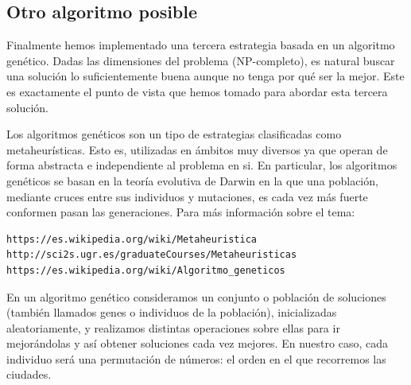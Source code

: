 \documentclass{article}
\begin{document}
\subsection{Otro algoritmo posible}

Finalmente hemos implementado una tercera estrategia basada en un algoritmo genético. Dadas las dimensiones del problema (NP-completo), es natural buscar una solución lo suficientemente buena aunque no tenga por qué ser la mejor. Este es exactamente el punto de vista que hemos tomado para abordar esta tercera solución.

Los algoritmos genéticos son un tipo de estrategias clasificadas como metaheurísticas. Esto es, utilizadas en ámbitos muy diversos ya que operan de forma abstracta e independiente al problema en si. En particular, los algoritmos genéticos se basan en la teoría evolutiva de Darwin en la que una población, mediante cruces entre sus individuos y mutaciones, es cada vez más fuerte conformen pasan las generaciones. Para más información sobre el tema:

\begin{verbatim}
https://es.wikipedia.org/wiki/Metaheuristica
http://sci2s.ugr.es/graduateCourses/Metaheuristicas
https://es.wikipedia.org/wiki/Algoritmo_geneticos
\end{verbatim}

En un algoritmo genético consideramos un conjunto o población de soluciones (también llamados genes o individuos de la población), inicializadas aleatoriamente, y realizamos distintas operaciones sobre ellas para ir mejorándolas y así obtener soluciones cada vez mejores. En nuestro caso, cada individuo será una permutación de números: el orden en el que recorremos las ciudades.
\end{document}
